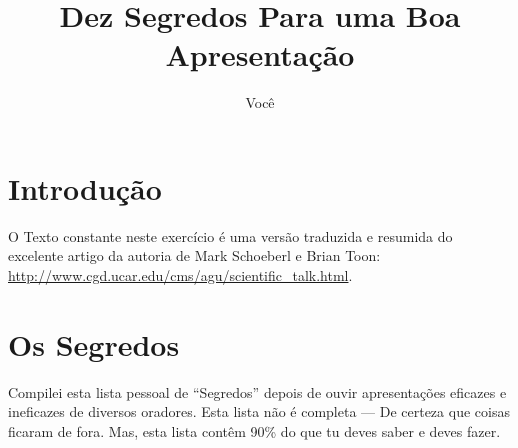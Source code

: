 \documentclass[12pt]{article}
\title{Dez Segredos Para uma Boa Apresentação}
\author{Você}
\begin{document}
\maketitle

\section{Introdução}

O Texto constante neste exercício é uma versão traduzida e resumida do excelente artigo da autoria de Mark Schoeberl e Brian Toon: \url{http://www.cgd.ucar.edu/cms/agu/scientific_talk.html}.

\section{Os Segredos}

Compilei esta lista pessoal de ``Segredos'' depois de ouvir apresentações eficazes e ineficazes de diversos oradores.
Esta lista não é completa --- De certeza que coisas ficaram de fora.
Mas, esta lista contêm 90\% do que tu deves saber e deves fazer.
\end{document}
